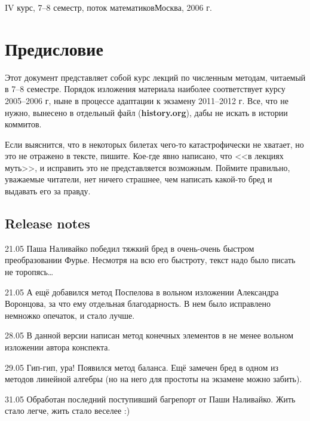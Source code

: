 \documentclass[a4paper]{article}
\begin{document}
 {IV курс, 7--8 семестр, поток
  математиков}{Москва, 2006 г.}

\pagebreak
\tableofcontents

\pagebreak

\section*{Предисловие}


Этот документ представляет собой курс лекций по численным методам,
читаемый в 7--8 семестре.  Порядок изложения материала наиболее
соответствует курсу 2005--2006 г, ныне в процессе адаптации к экзамену 
2011--2012 г. Все, что не нужно, вынесено в отдельный файл ({\bf history.org}),
дабы не искать в истории коммитов. 

Если выяснится, что в некоторых билетах чего-то катастрофически не
хватает, но это не отражено в тексте, пишите.  Кое-где явно написано,
что <<в лекциях муть>>, и исправить это не представляется возможным.
Поймите правильно, уважаемые читатели, нет ничего страшнее, чем
написать какой-то бред и выдавать его за правду.

\subsection*{Release notes}

\begin{items}{-2}
\item [21.05] Паша Наливайко победил тяжкий бред в очень-очень быстром
  преобразовании Фурье.  Несмотря на всю его быстроту, текст надо было
  писать не торопясь\dots
\item [21.05] А ещё добавился метод Поспелова в вольном изложении
  Александра Воронцова, за что ему отдельная благодарность.  В нем
  было исправлено немножко опечаток, и стало лучше.
\item [28.05] В данной версии написан метод конечных элементов в не
  менее вольном изложении автора конспекта.
\item [29.05] Гип-гип, ура! Появился метод баланса. Ещё замечен бред в
  одном из методов линейной алгебры (но на него для простоты на
  экзамене можно забить).
\item [31.05] Обработан последний поступивший багрепорт от Паши
  Наливайко. Жить стало легче, жить стало веселее :)
\end{items}

\medskip
\end{document}
